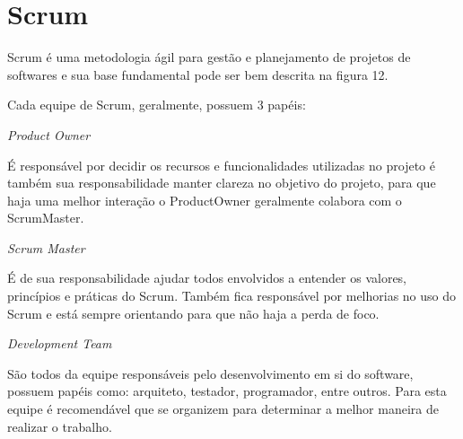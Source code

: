 \section{Scrum}
\label{sec:scrum}

Scrum é uma metodologia ágil para gestão e planejamento de projetos de softwares e sua base fundamental pode ser bem descrita na figura 12.

	\begin{figure}[h!]
		\centering
	\end{figure}

Cada equipe de Scrum, geralmente, possuem 3 papéis:
\begin{alineascomponto}
	\item \textit{Product Owner}
	
É responsável por decidir os recursos e funcionalidades utilizadas no projeto é também sua responsabilidade manter clareza no objetivo do projeto, para que haja uma melhor interação o ProductOwner geralmente colabora com o ScrumMaster.

	\item \textit{Scrum Master}
	
É de sua responsabilidade ajudar todos envolvidos a entender os valores, princípios e práticas do Scrum. Também fica responsável por melhorias no uso do Scrum e está sempre orientando para que não haja a perda de foco. 

	\item \textit{Development Team}
	
São todos da equipe responsáveis pelo desenvolvimento em si do software, possuem papéis como: arquiteto, testador, programador, entre outros. Para esta equipe é recomendável que se organizem para determinar a melhor maneira de realizar o trabalho.
\pagebreak

	\end{alineascomponto}
	
